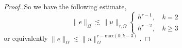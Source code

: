 \begin{proof}
        So we have the following estimate,\begin{equation}
            \| e \|_{ \Omega  }^{  }  \lesssim  \| u \|_{ r,\Omega  }^{  }  \begin{cases}
                h^{r-1}, \quad k=2 \\
                h^{r-2}, \quad k\ge 3
            \end{cases}
        \end{equation}
        or equivalently $\| e \|_{\Omega   }^{  } \lesssim \| u \|_{\Omega   }^{r- \mathrm{max}(0,k-3)   } $.


\end{proof}


